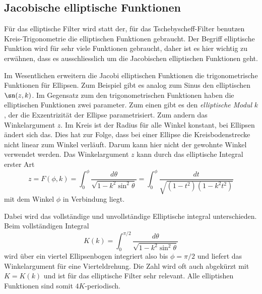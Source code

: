 \begin{refsection}
\section{Jacobische elliptische Funktionen}


Für das elliptische Filter wird statt der, für das Tschebyscheff-Filter benutzen Kreis-Trigonometrie die elliptischen Funktionen gebraucht.
Der Begriff elliptische Funktion wird für sehr viele Funktionen gebraucht, daher ist es hier wichtig zu erwähnen, dass es ausschliesslich um die Jacobischen elliptischen Funktionen geht.

Im Wesentlichen erweitern die Jacobi elliptischen Funktionen die trigonometrische Funktionen für Ellipsen.
Zum Beispiel gibt es analog zum Sinus den elliptischen $\sn(z, k)$.
Im Gegensatz zum den trigonometrischen Funktionen haben die elliptischen Funktionen zwei parameter.
Zum einen gibt es den \textit{elliptische Modul} $k$, der die Exzentrizität der Ellipse parametrisiert.
Zum andern das Winkelargument $z$.
Im Kreis ist der Radius für alle Winkel konstant, bei Ellipsen ändert sich das.
Dies hat zur Folge, dass bei einer Ellipse die Kreisbodenstrecke nicht linear zum Winkel verläuft.
Darum kann hier nicht der gewohnte Winkel verwendet werden.
Das Winkelargument $z$ kann durch das elliptische Integral erster Art
\begin{equation}
    z
    =
    F(\phi, k)
    =
    \int_{0}^{\phi}
    \frac{
        d\theta
    }{
        \sqrt{
            1-k^2 \sin^2 \theta
        }
    }
    =
    \int_{0}^{\phi}
    \frac{
        dt
    }{
        \sqrt{
            (1-t^2)(1-k^2 t^2)
        }
    } %
\end{equation}
mit dem Winkel $\phi$ in Verbindung liegt.

Dabei wird das vollständige und unvollständige Elliptische integral unterschieden.
Beim vollständigen Integral
\begin{equation}
    K(k)
    =
    \int_{0}^{\pi / 2}
    \frac{
        d\theta
    }{
        \sqrt{
            1-k^2 \sin^2 \theta
        }
    }
\end{equation}
wird über ein viertel Ellipsenbogen integriert also bis $\phi=\pi/2$ und liefert das Winkelargument für eine Vierteldrehung.
Die Zahl wird oft auch abgekürzt mit $K = K(k)$ und ist für das elliptische Filter sehr relevant.
Alle elliptishen Funktionen sind somit $4K$-periodisch.


\end{refsection}
